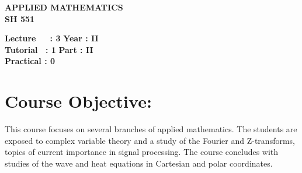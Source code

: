 \begin{center}
    \textbf{\huge{\uppercase{Applied Mathematics}}}
    \\
    \vspace{.5cm}
    \textbf{\large{SH 551}}
\end{center}

\noindent\textbf{Lecture\ \ \ : 3} \hfill \textbf{Year : II } \\
\textbf{Tutorial \ : 1} \hfill \textbf{Part : II } \\
\textbf{Practical : 0}  \\

\par
\noindent 
\section*{Course Objective:}
This course focuses on several branches of applied mathematics. The students are exposed to complex variable theory and a study of the Fourier and Z-transforms, topics of current importance in signal processing. The course concludes with studies of the wave and heat equations in Cartesian and polar coordinates.


